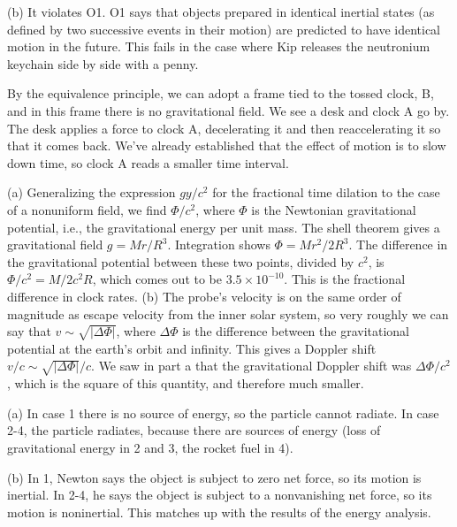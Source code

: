 (b) It violates O1. O1 says that objects prepared in identical inertial states
(as defined by two successive events in their motion) are predicted to have
identical motion in the future. This fails in the case where Kip releases the
neutronium keychain side by side with a penny.

By the equivalence principle, we can adopt a frame tied to the tossed clock, B, and in this
frame there is no gravitational field. We see a desk and clock A go by. The desk applies
a force to clock A, decelerating it and then reaccelerating it so that it comes back.
We've already established that the effect of motion is to slow down time, so clock
A reads a smaller time interval.

(a) Generalizing the expression $gy/c^2$ for the fractional time dilation to the case of a nonuniform
field, we find $\Phi/c^2$, where $\Phi$ is the Newtonian gravitational potential, i.e., the
gravitational energy per unit mass.
The shell theorem gives a gravitational field $g=Mr/R^3$. Integration shows
$\Phi=Mr^2/2R^3$. The difference in the gravitational potential between these two points, divided by $c^2$, is
$\Phi/c^2=M/2c^2R$, which comes out to be $3.5\times 10^{-10}$. This is the fractional difference in clock rates.
(b) The probe's velocity is on the same order of magnitude as escape velocity from the inner solar system,
so very roughly we can say that $v\sim\sqrt{|\Delta\Phi|}$, where $\Delta\Phi$ is the difference between the gravitational
potential at the earth's orbit and infinity. This gives a Doppler shift $v/c\sim \sqrt{|\Delta\Phi|}/c$.
We saw in part a that the gravitational Doppler shift was $\Delta\Phi/c^2$, which is the square of this
quantity, and therefore much smaller.

(a) In case 1 there is no source of energy, so the particle cannot radiate.
In case 2-4, the particle radiates, because there are sources of energy (loss of
gravitational energy in 2 and 3, the rocket fuel in 4).

(b) In 1, Newton says the object is subject to zero net force, so its motion
is inertial. In 2-4, he says the object is subject to a nonvanishing net force,
so its motion is noninertial. This matches up with the results of the energy analysis.

